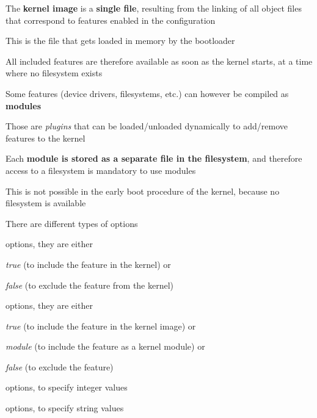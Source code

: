   \startitemize
  \item The {\bf kernel image} is a {\bf single file}, resulting from
    the linking of all object files that correspond to features
    enabled in the configuration
    \startitemize
    \item This is the file that gets loaded in memory by the
      bootloader
    \item All included features are therefore available as soon as the
      kernel starts, at a time where no filesystem exists
    \stopitemize
  \item Some features (device drivers, filesystems, etc.) can however
    be compiled as {\bf modules}
    \startitemize
    \item Those are {\em plugins} that can be loaded/unloaded dynamically to
      add/remove features to the kernel
    \item Each {\bf module is stored as a separate file in the
        filesystem}, and therefore access to a filesystem is mandatory
      to use modules
    \item This is not possible in the early boot procedure of the
      kernel, because no filesystem is available
    \stopitemize
  \stopitemize

  \startitemize
  \item There are different types of options
    \startitemize
    \item {} options, they are either
      \startitemize
      \item {\em true} (to include the feature in the kernel) or
      \item {\em false} (to exclude the feature from the kernel)
      \stopitemize
    \item {} options, they are either
      \startitemize
      \item {\em true} (to include the feature in the kernel image) or
      \item {\em module} (to include the feature as a kernel module) or
      \item {\em false} (to exclude the feature)
      \stopitemize
    \item {} options, to specify integer values
    \item {} options, to specify string values
    \stopitemize
  \stopitemize

